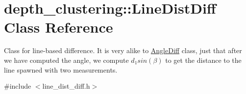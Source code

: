 \hypertarget{classdepth__clustering_1_1LineDistDiff}{\section{depth\-\_\-clustering\-:\-:Line\-Dist\-Diff Class Reference}
\label{classdepth__clustering_1_1LineDistDiff}
}


Class for line-\/based difference. It is very alike to \hyperlink{classdepth__clustering_1_1AngleDiff}{Angle\-Diff} class, just that after we have computed the angle, we compute $d_1 sin(\beta)$ to get the distance to the line spawned with two measurements.  




{\ttfamily \#include $<$line\-\_\-dist\-\_\-diff.\-h$>$}

